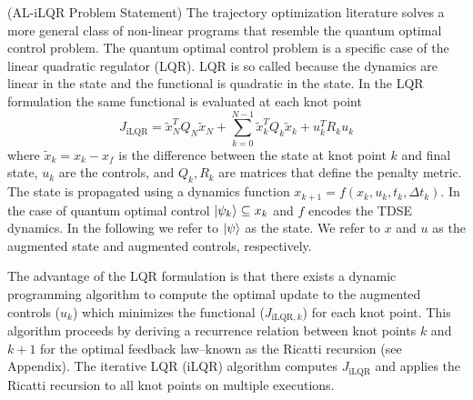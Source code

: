\documentclass[
  amsfonts,
  amsmath,
  tbtags,
  amssymb,
  aps,
  nobibnotes,
  twocolumn,
  superscriptaddress,
]{revtex4-2}
\begin{document}
(AL-iLQR Problem Statement) The trajectory optimization
literature solves a more general class of non-linear programs that resemble
the quantum optimal control problem. The quantum optimal control
problem is a specific case of the linear quadratic regulator (LQR).
LQR is so called because the dynamics are linear in the state and
the functional is quadratic in the state. In the LQR formulation
the same functional is evaluated at each knot point
\begin{equation}
  J_{\textrm{iLQR}} = \tilde{x}_{N}^{T} Q_{N} \tilde{x}_{N}
  + \sum_{k = 0}^{N - 1} \tilde{x}_{k}^{T} Q_{k} \tilde{x}_{k} + u_{k}^{T} R_{k} u_{k}
\end{equation}
where $\tilde{x}_{k} = x_{k} - x_{f}$ is the difference between the state
at knot point $k$ and final state, $u_{k}$ are the controls,
and $Q_{k}, R_{k}$ are matrices that define the penalty metric.
The state is propagated using a dynamics function
$x_{k + 1} = f(x_{k}, u_{k}, t_{k}, \Delta t_{k})$.
In the case of quantum optimal control $\ket{\psi_{k}} \subseteq x_{k}$
and $f$ encodes the TDSE dynamics. In the following
we refer to $\ket{\psi}$ as the state. We refer to $x$ and $u$ as
the augmented state and augmented controls, respectively.

The advantage of the LQR formulation
is that there exists a dynamic programming algorithm to compute the
optimal update to the augmented controls ($u_{k}$) which minimizes the functional
($J_{\textrm{iLQR}, k}$) for each knot point. This algorithm proceeds by deriving a
recurrence relation between knot points $k$ and $k + 1$ for the optimal
feedback law--known as the Ricatti recursion (see Appendix). The
iterative LQR (iLQR) algorithm computes $J_{\textrm{iLQR}}$
and applies the Ricatti recursion to all knot points on multiple
executions.
\end{document}
